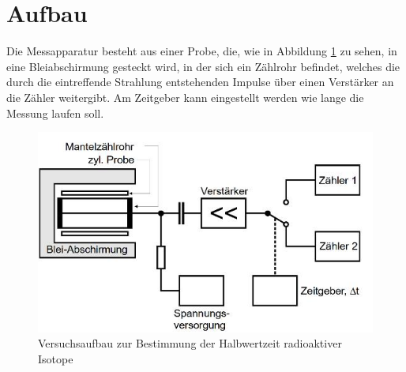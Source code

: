 \section{Aufbau}
\label{sec:Aufbau}

Die Messapparatur besteht aus einer Probe, die, wie in Abbildung \ref{fig:Aufbau} zu sehen, in eine Bleiabschirmung gesteckt wird, in der sich ein Zählrohr befindet, welches die durch die eintreffende Strahlung entstehenden Impulse über einen Verstärker an die Zähler weitergibt. Am Zeitgeber kann eingestellt werden wie lange die Messung laufen soll.
\begin{figure}
\centering
\includegraphics[scale=0.5]{content/images/aufbau.jpg}
\caption{Versuchsaufbau zur Bestimmung der Halbwertzeit radioaktiver Isotope \cite{V702}}
\label{fig:Aufbau}
\end{figure}